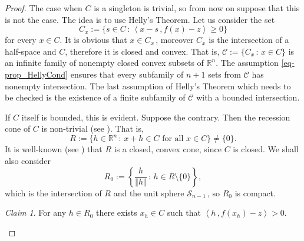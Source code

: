 \documentclass[12pt]{amsart}
\theoremstyle{remark}
\newtheorem{claim}{Claim}
\theoremstyle{definition}
\newcommand{\Rn}{\mathbb{R}^n}
\newcommand{\nma}{\Vert}
\newcommand{\bsz}[2]{\left \langle #1 \,, #2 \right \rangle}
\begin{document}
\begin{proof}
The case when $ C $ is a singleton is trivial, so from 
now on suppose that this is not the case.  
The idea is to use Helly's Theorem. 
Let us consider the set 
\[
C_x := 
\lbrace s \in C \, : \, 
\bsz{x-s}{f(x)-z} \geq 0 
\rbrace 
\]
for every $ x \in C $. It is obvious that $ x \in C_x \,$, 
moreover $ C_x $ is the intersection of a half-space and 
$ C $, therefore it is closed and convex. That is, 
$ \mathcal{C} := \lbrace C_x \, : \, x \in C \rbrace $ 
is an infinite family of nonempty closed convex subsets 
of $ \Rn $. 
The assumption \eqref{eq-prop_HellyCond} ensures that 
every subfamily of $ n+1 $ sets from $ \mathcal{C} $ 
has nonempty intersection. The last assumption of 
Helly's Theorem which needs to be checked is the 
existence of a finite subfamily of $ \mathcal{C} $ with 
a bounded intersection. 

If $ C $ itself is bounded, this is evident. 
Suppose the contrary. Then the recession cone 
of $ C $ is non-trivial (see \cite[Theorem 8.4]{Roc70}). 
That is, 
\[
R := \lbrace h \in \Rn \, : \, x+h \in C 
\mbox{ for all } x \in C \rbrace \neq \lbrace 0 \rbrace. 
\] 
It is well-known (see \cite[Theorem 8.2]{Roc70}) 
that $ R $ is a 
closed, convex cone, since $ C $ is closed. 
We shall also consider 
\[
R_0 := \left \lbrace \frac{h}{\nma h \nma} \, : \, 
h \in R \setminus \{ 0 \} \right \rbrace, 
\]
which is the intersection of 
$ R $ and the unit sphere $ \mathcal{S}_{n-1} \,$, 
so $ R_0 $ is compact. 
\begin{claim}\label{clm-prop_Claim1}
For any $ h \in R_0 $ there exists $ x_h \in C $ 
such that 
$ \bsz{h}{f(x_h)-z} > 0 $. 
\end{claim}


\end{proof}
\end{document}
